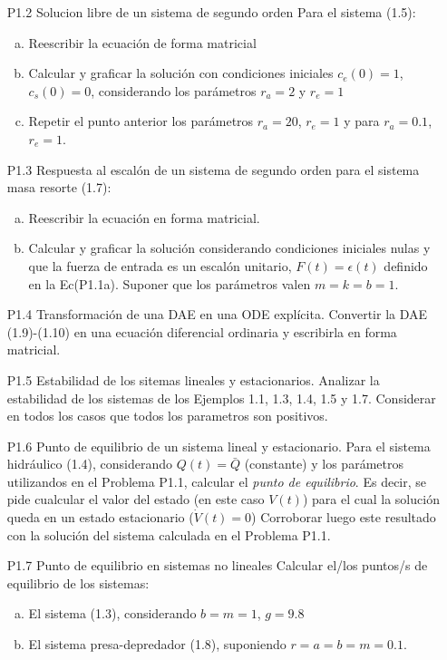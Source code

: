 \documentclass{article}
\begin{document}
\begin{itemize}
  \item[P1.2] Solucion libre de un sistema de segundo orden
	Para el sistema (1.5):
	\begin{enumerate}[a)]
	\item Reescribir la ecuación de forma matricial
	\item Calcular y graficar la solución con condiciones iniciales $c_{e}(0)=1$, $c_{s}(0)=0$, considerando los parámetros $r_{a}=2$ y $r_{e}=1$
	\item Repetir el punto anterior los parámetros $r_{a}=20$, $r_{e}=1$ y para $r_{a} = 0.1$, $r_{e}=1$.
	\end{enumerate}
  \item[P1.3] Respuesta al escalón de un sistema de segundo orden para el sistema masa resorte (1.7):
	\begin{enumerate}[a)]
	\item Reescribir la ecuación en forma matricial.
	\item Calcular y graficar la solución considerando condiciones iniciales nulas y que la fuerza de entrada es un escalón unitario, $F(t)=\epsilon(t)$ definido en la Ec(P1.1a). Suponer que los parámetros valen $m=k=b=1$.
	\end{enumerate}

  \item[P1.4] Transformación de una DAE en una ODE explícita. Convertir la DAE (1.9)-(1.10) en una ecuación diferencial ordinaria y escribirla en forma matricial.

  \item[P1.5] Estabilidad de los sitemas lineales y estacionarios. Analizar la estabilidad de los sistemas de los Ejemplos 1.1, 1.3, 1.4, 1.5 y 1.7. Considerar en todos los casos que todos los parametros son positivos.

  \item[P1.6] Punto de equilibrio de un sistema lineal y estacionario. Para el sistema hidráulico (1.4), considerando $Q(t)=\bar{Q}$ (constante) y los parámetros utilizandos en el Problema P1.1, calcular el \textit{punto de equilibrio}. Es decir, se pide cualcular el valor del estado (en este caso $V(t)$) para el cual la solución queda en un estado estacionario ($\dot{V}(t)=0$)
Corroborar luego este resultado con la solución del sistema calculada en el Problema P1.1.

   \item[P1.7] Punto de equilibrio en sistemas no lineales Calcular el/los puntos/s de equilibrio de los sistemas:
	\begin{enumerate}[a)]
	\item El sistema (1.3), considerando $b=m=1$, $g=9.8$
	\item El sistema presa-depredador (1.8), suponiendo $r=a=b=m=0.1$. 
	\end{enumerate}


\end{itemize}
\end{document}
